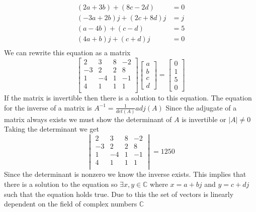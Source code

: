 \documentclass{article}
\begin{document}
\begin{enumerate}[a)]
\begin{align*}
(2a+3b) + (8c-2d)  &= 0 \\
(-3a+2b)j + (2c+8d)j &= j \\
(a-4b) + (c-d) &= 5 \\
(4a+b)j + (c+d)j &= 0\\
\end{align*}
We can rewrite this equation as a matrix
$$
\begin{bmatrix}
 2 &  3 & 8 & -2 \\
-3 &  2 & 2 &  8 \\
 1 & -4 & 1 & -1 \\
 4 &  1 & 1 &  1 \\
\end{bmatrix}
\begin{bmatrix}
a \\ b \\ c \\ d
\end{bmatrix}
=
\begin{bmatrix}
0 \\ 1 \\ 5 \\ 0
\end{bmatrix}
$$
If the matrix is invertible then there is a solution to this equation.
The equation for the inverse of a matrix is $A^{-1} = \frac{1}{det(A)}adj(A)$
Since the adjugate of a matrix always exists we must show the determinant of $A$ is invertible or $|A| \neq 0$
Taking the determinant we get
$$
\begin{vmatrix}
 2 &  3 & 8 & -2 \\
-3 &  2 & 2 &  8 \\
 1 & -4 & 1 & -1 \\
 4 &  1 & 1 &  1 \\
\end{vmatrix}
= 1250
$$
Since the determinant is nonzero we know the inverse exists.
This implies that there is a solution to the equation so $ \exists x,y \in \mathbb{C}$ where $x =a+bj$ and $y = c+dj$ such that the equation holds true.
Due to this the set of vectors is linearly dependent on the field of complex numbers $\mathbb{C}$


\end{enumerate}
\end{document}
